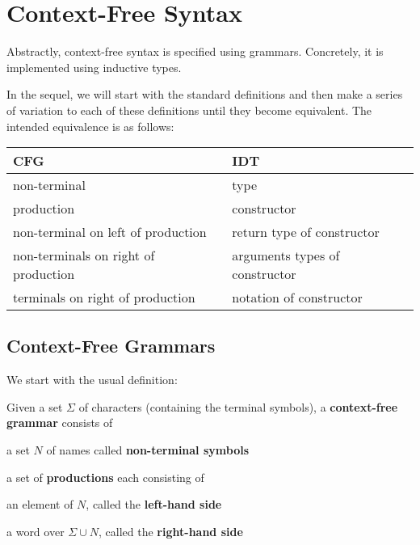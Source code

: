 \section{Context-Free Syntax}

Abstractly, context-free syntax is specified using grammars.
Concretely, it is implemented using inductive types.

In the sequel, we will start with the standard definitions and then make a series of variation to each of these definitions until they become equivalent.
The intended equivalence is as follows:
\begin{center}
\begin{tabular}{l|l}
CFG & IDT \\
\hline
non-terminal & type \\
production & constructor \\
non-terminal on left of production & return type of constructor \\
non-terminals on right of production & arguments types of constructor \\
terminals on right of production & notation of constructor
\end{tabular}
\end{center}

\subsection{Context-Free Grammars}

We start with the usual definition:

\begin{definition}
Given a set $\Sigma$ of characters (containing the terminal symbols), a \textbf{context-free grammar} consists of
\begin{compactitem}
\item a set $N$ of names called \textbf{non-terminal symbols}
\item a set of \textbf{productions} each consisting of
 \begin{compactitem}
  \item an element of $N$, called the \textbf{left-hand side}\\
  \item a word over $\Sigma\cup N$, called the \textbf{right-hand side}
 \end{compactitem}
\end{compactitem}
\end{definition}

